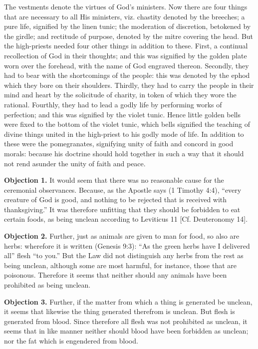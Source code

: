 The vestments denote the virtues of God's ministers. Now there are four things that are necessary to all His ministers, viz. chastity denoted by the breeches; a pure life, signified by the linen tunic; the moderation of discretion, betokened by the girdle; and rectitude of purpose, denoted by the mitre covering the head. But the high-priests needed four other things in addition to these. First, a continual recollection of God in their thoughts; and this was signified by the golden plate worn over the forehead, with the name of God engraved thereon. Secondly, they had to bear with the shortcomings of the people: this was denoted by the ephod which they bore on their shoulders. Thirdly, they had to carry the people in their mind and heart by the solicitude of charity, in token of which they wore the rational. Fourthly, they had to lead a godly life by performing works of perfection; and this was signified by the violet tunic. Hence little golden bells were fixed to the bottom of the violet tunic, which bells signified the teaching of divine things united in the high-priest to his godly mode of life. In addition to these were the pomegranates, signifying unity of faith and concord in good morals: because his doctrine should hold together in such a way that it should not rend asunder the unity of faith and peace.


\textbf{Objection 1.} It would seem that there was no reasonable cause for the ceremonial observances. Because, as the Apostle says (1 Timothy 4:4), ``every creature of God is good, and nothing to be rejected that is received with thanksgiving.'' It was therefore unfitting that they should be forbidden to eat certain foods, as being unclean according to Leviticus 11 [Cf. Deuteronomy 14].

\textbf{Objection 2.} Further, just as animals are given to man for food, so also are herbs: wherefore it is written (Genesis 9:3): ``As the green herbs have I delivered all'' flesh ``to you.'' But the Law did not distinguish any herbs from the rest as being unclean, although some are most harmful, for instance, those that are poisonous. Therefore it seems that neither should any animals have been prohibited as being unclean.

\textbf{Objection 3.} Further, if the matter from which a thing is generated be unclean, it seems that likewise the thing generated therefrom is unclean. But flesh is generated from blood. Since therefore all flesh was not prohibited as unclean, it seems that in like manner neither should blood have been forbidden as unclean; nor the fat which is engendered from blood.


